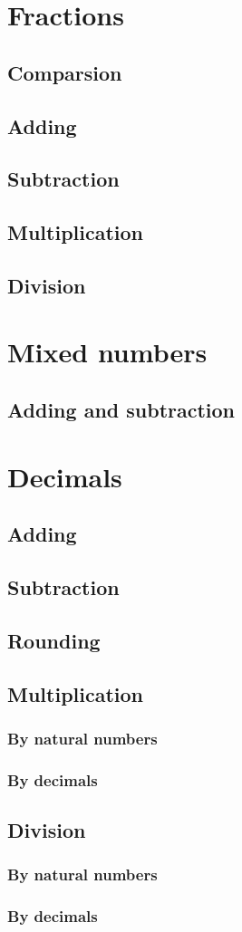 \documentclass[a4paper, 12pt]{article}
\begin{document}
	

	{\Large \section {Fractions}}

	\subsection{Comparsion}
	\subsection{Adding}
	\subsection{Subtraction}
	\subsection{Multiplication}
	\subsection{Division}

	{\Large \section {Mixed numbers}}

	\subsection{Adding and subtraction}

	{\Large \section {Decimals}}
	
	\subsection{Adding}
	\subsection{Subtraction}
	\subsection{Rounding}
	\subsection{Multiplication}
	\subsubsection{By natural numbers}
	\subsubsection{By decimals}
	\subsection{Division}
	\subsubsection{By natural numbers}
	\subsubsection{By decimals}

	
		
\end{document}
